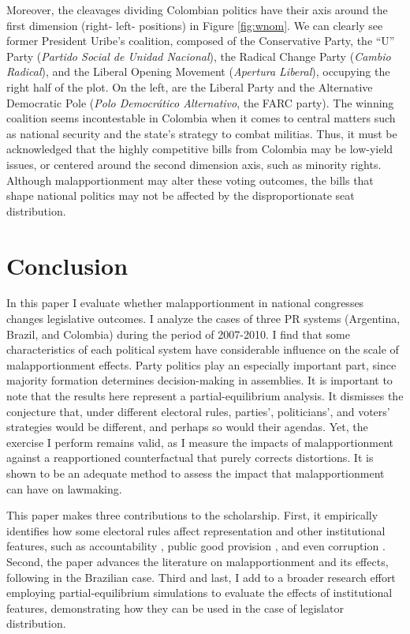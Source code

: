 \documentclass[a4paper,12pt]{article}
\begin{document}
Moreover, the cleavages dividing Colombian politics have their axis around the first dimension (right- left- positions) in Figure \ref{fig:wnom}. We can clearly see former President Uribe's coalition, composed of the Conservative Party, the ``U'' Party (\textit{Partido Social de Unidad Nacional}), the Radical Change Party (\textit{Cambio Radical}), and the Liberal Opening Movement (\textit{Apertura Liberal}), occupying the right half of the plot. On the left, are the Liberal Party and the Alternative Democratic Pole (\textit{Polo Democrático Alternativo}, the FARC party). The winning coalition seems incontestable in Colombia when it comes to central matters such as national security and the state's strategy to combat militias. Thus, it must be acknowledged that the highly competitive bills from Colombia may be low-yield issues, or centered around the second dimension axis, such as minority rights. Although malapportionment may alter these voting outcomes, the bills that shape national politics may not be affected by the disproportionate seat distribution. 


\section{Conclusion}
\label{sec:conclusion}

In this paper I evaluate whether malapportionment in national congresses changes legislative outcomes. I analyze the cases of three PR systems (Argentina, Brazil, and Colombia) during the period of 2007-2010. I find that some characteristics of each political system have considerable influence on the scale of malapportionment effects. Party politics play an especially important part, since majority formation determines decision-making in assemblies. It is important to note that the results here represent a partial-equilibrium analysis. It dismisses the conjecture that, under different electoral rules, parties', politicians', and voters' strategies would be different, and perhaps so would their agendas. Yet, the exercise I perform remains valid, as I measure the impacts of malapportionment against a reapportioned counterfactual that purely corrects distortions. It is shown to be an adequate method to assess the impact that malapportionment can have on lawmaking.

This paper makes three contributions to the scholarship. First, it empirically identifies how some electoral rules affect representation \citep{carey2011electoral, pierzgalski2018balancing} and other institutional features, such as accountability \citep{myerson1993incentives}, public good provision \citep{lizzeri2001provision}, and even corruption \citep{persson2003electoral}. Second, the paper advances the literature on malapportionment and its effects, following \citet{mignozzetti2011faz} in the Brazilian case. Third and last, I add to a broader research effort employing partial-equilibrium simulations to evaluate the effects of institutional features, demonstrating how they can be used in the case of legislator distribution. 
\end{document}
